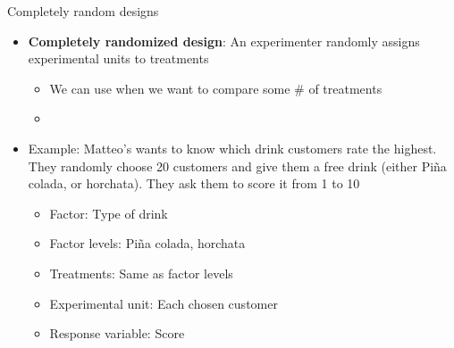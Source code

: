 \documentclass[xcolor=dvipsnames]{beamer}
\begin{document}
\begin{frame}{Completely random designs}
	\begin{itemize}
		\item \textbf{Completely randomized design}: An experimenter randomly assigns experimental units to treatments \pause
		\begin{itemize}
			\item We can use when we want to compare some \# of treatments \pause
			\item[]
		\end{itemize}
	\item Example: Matteo's wants to know which drink customers rate the highest. They randomly choose 20 customers and give them a free drink (either Pi\~{n}a colada, or horchata). They ask them to score it from 1 to 10 \pause
	\begin{itemize}
		\item Factor: Type of drink \pause
		\item Factor levels: Pi\~{n}a colada, horchata \pause
		\item Treatments: Same as factor levels \pause
		\item Experimental unit: Each chosen customer \pause
		\item Response variable: Score
	\end{itemize}
	\end{itemize}
\end{frame}
\end{document}
